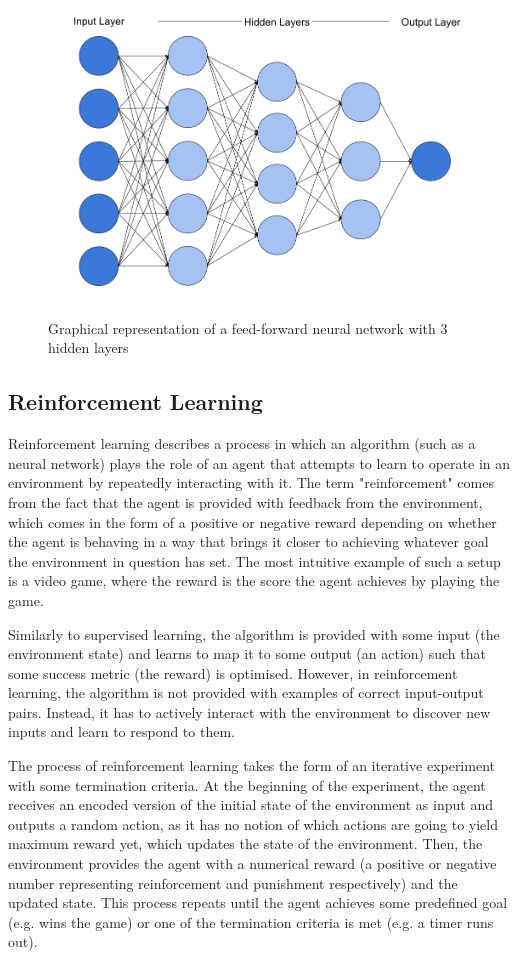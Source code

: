 \begin{figure}[ht]
    \centering
    \includegraphics[width=12cm]{images/neural_network.png}
    \caption{Graphical representation of a feed-forward neural network with 3 hidden layers}
    \label{fig:neural_network}
\end{figure}

\subsection{Reinforcement Learning}
Reinforcement learning describes a process in which an algorithm (such as a neural network) plays the role of an agent that attempts to learn to operate in an environment by repeatedly interacting with it. The term "reinforcement" comes from the fact that the agent is provided with feedback from the environment, which comes in the form of a positive or negative reward depending on whether the agent is behaving in a way that brings it closer to achieving whatever goal the environment in question has set. The most intuitive example of such a setup is a video game, where the reward is the score the agent achieves by playing the game.

Similarly to supervised learning, the algorithm is provided with some input (the environment state) and learns to map it to some output (an action) such that some success metric (the reward) is optimised. However, in reinforcement learning, the algorithm is not provided with examples of correct input-output pairs. Instead, it has to actively interact with the environment to discover new inputs and learn to respond to them.

The process of reinforcement learning takes the form of an iterative experiment with some termination criteria. At the beginning of the experiment, the agent receives an encoded version of the initial state of the environment as input and outputs a random action, as it has no notion of which actions are going to yield maximum reward yet, which updates the state of the environment. Then, the environment provides the agent with a numerical reward (a positive or negative number representing reinforcement and punishment respectively) and the updated state. This process repeats until the agent achieves some predefined goal (e.g. wins the game) or one of the termination criteria is met (e.g. a timer runs out).

